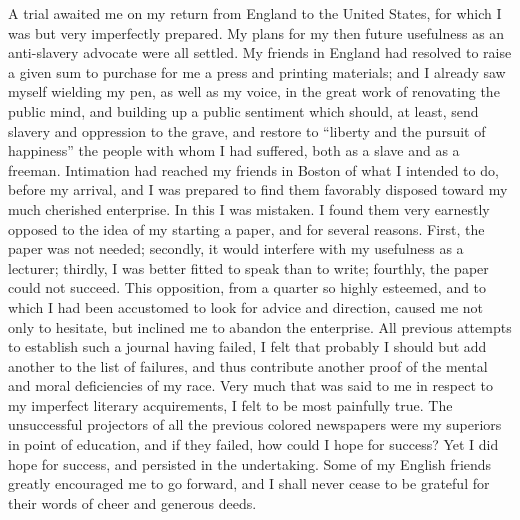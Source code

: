 A trial awaited me on my return from England to the United States, for
which I was but very imperfectly prepared. My plans for my then future
usefulness as an anti-slavery advocate were all settled. My friends in
England had resolved to raise a given sum to purchase for me a press and
printing materials; and I already saw myself wielding my pen, as well as
my voice, in the great work of renovating the public mind, and building
up a public sentiment {\protect\hypertarget{393}{}{}}which should, at
least, send slavery and oppression to the grave, and restore to
``liberty and the pursuit of happiness'' the people with whom I had
suffered, both as a slave and as a freeman. Intimation had reached my
friends in Boston of what I intended to do, before my arrival, and I was
prepared to find them favorably disposed toward my much cherished
enterprise. In this I was mistaken. I found them very earnestly opposed
to the idea of my starting a paper, and for several reasons. First, the
paper was not needed; secondly, it would interfere with my usefulness as
a lecturer; thirdly, I was better fitted to speak than to write;
fourthly, the paper could not succeed. This opposition, from a quarter
so highly esteemed, and to which I had been accustomed to look for
advice and direction, caused me not only to hesitate, but inclined me to
abandon the enterprise. All previous attempts to establish such a
journal having failed, I felt that probably I should but add another to
the list of failures, and thus contribute another proof of the mental
and moral deficiencies of my race. Very much that was said to me in
respect to my imperfect literary acquirements, I felt to be most
painfully true. The unsuccessful projectors of all the previous colored
newspapers were my superiors in point of education, and if they failed,
how could I hope for success? Yet I did hope for success, and persisted
in the undertaking. Some of my English friends greatly encouraged me to
go forward, and I shall never cease to be grateful for their words of
cheer and generous deeds.

